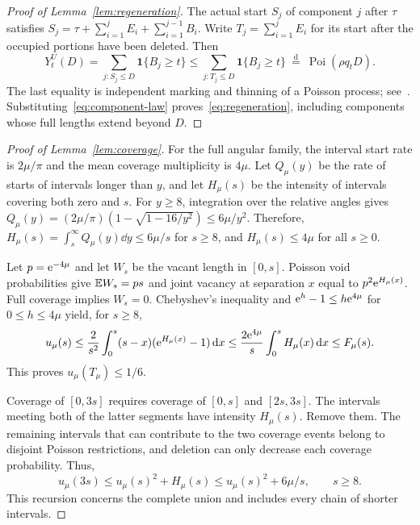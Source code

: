 \documentclass[11pt,letterpaper]{article}
\begin{document}
\begin{proof}[Proof of Lemma~\ref{lem:regeneration}]
The actual start $S_j$ of component $j$ after $\tau$ satisfies $S_j=\tau+\sum_{i=1}^jE_i+\sum_{i=1}^{j-1}B_i$. Write $T_j=\sum_{i=1}^jE_i$ for its start after the occupied portions have been deleted. Then
\begin{equation}\label{eq:compression}
 Y_t^U(D)=\sum_{j:S_j\le D}\mathbf1\{B_j\ge t\}
 \le\sum_{j:T_j\le D}\mathbf1\{B_j\ge t\}
 \ \stackrel{\mathrm d}=\ \operatorname{Poi}(\rho q_tD).
\end{equation}
The last equality is independent marking and thinning of a Poisson process; see~\cite[Sections~5.2--5.3]{LP17}. Substituting~\eqref{eq:component-law} proves~\eqref{eq:regeneration}, including components whose full lengths extend beyond $D$.
\end{proof}

\begin{proof}[Proof of Lemma~\ref{lem:coverage}]
For the full angular family, the interval start rate is $2\mu/\pi$ and the mean coverage multiplicity is $4\mu$. Let $Q_\mu(y)$ be the rate of starts of intervals longer than $y$, and let $H_\mu(s)$ be the intensity of intervals covering both zero and $s$. For $y\ge8$, integration over the relative angles gives $Q_\mu(y)=(2\mu/\pi)(1-\sqrt{1-16/y^2})\le6\mu/y^2$. Therefore, $H_\mu(s)=\int_s^\infty Q_\mu(y)\dd y\le6\mu/s$ for $s\ge8$, and $H_\mu(s)\le4\mu$ for all $s\ge0$.

Let $p=\mathrm{e}^{-4\mu}$ and let $W_s$ be the vacant length in $[0,s]$. Poisson void probabilities give $\mathbb E W_s=ps$ and joint vacancy at separation $x$ equal to $p^2\mathrm{e}^{H_\mu(x)}$. Full coverage implies $W_s=0$. Chebyshev's inequality and $\mathrm{e}^h-1\le h\mathrm{e}^{4\mu}$ for $0\le h\le4\mu$ yield, for $s\ge8$,
\begin{equation}\label{eq:seed}
 u_\mu(s)\le\frac{2}{s^2}\int_0^s(s-x)(\mathrm{e}^{H_\mu(x)}-1)\,\mathrm{d} x
 \le\frac{2\mathrm{e}^{4\mu}}s\int_0^sH_\mu(x)\,\mathrm{d} x
 \le F_\mu(s).
\end{equation}
This proves $u_\mu(T_\mu)\le1/6$.

Coverage of $[0,3s]$ requires coverage of $[0,s]$ and $[2s,3s]$. The intervals meeting both of the latter segments have intensity $H_\mu(s)$. Remove them. The remaining intervals that can contribute to the two coverage events belong to disjoint Poisson restrictions, and deletion can only decrease each coverage probability. Thus,
\begin{equation}\label{eq:recursion}
 u_\mu(3s)\le u_\mu(s)^2+H_\mu(s)
            \le u_\mu(s)^2+6\mu/s,\qquad s\ge8.
\end{equation}
This recursion concerns the complete union and includes every chain of shorter intervals.


\end{proof}
\end{document}
